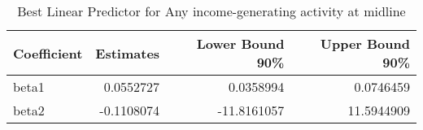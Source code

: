 \begin{table}

\caption{\label{tab:blpRany_iga}Best Linear Predictor for Any income-generating activity at midline}
\centering
\begin{tabular}[t]{lrrr}
\toprule
Coefficient & Estimates & Lower Bound 90\% & Upper Bound 90\%\\
\midrule
beta1 & 0.0552727 & 0.0358994 & 0.0746459\\
beta2 & -0.1108074 & -11.8161057 & 11.5944909\\
\bottomrule
\end{tabular}
\end{table}

